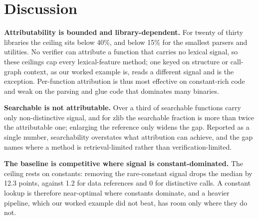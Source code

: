 \documentclass[conference]{IEEEtran}
\begin{document}
\section{Discussion}
\textbf{Attributability is bounded and library-dependent.} For twenty of thirty
libraries the ceiling sits below 40\%, and below 15\% for the smallest parsers and
utilities. No verifier can attribute a function that carries no lexical signal, so
these ceilings cap every lexical-feature method; one keyed on structure or call-graph
context, as our worked example is, reads a different signal and is the exception.
Per-function attribution is thus most effective on constant-rich code and weak on the
parsing and glue code that dominates many binaries.

\textbf{Searchable is not attributable.} Over a third of searchable functions carry only
non-distinctive signal, and for zlib the searchable fraction is more than twice the
attributable one; enlarging the reference only widens the gap. Reported as a single
number, searchability overstates what attribution can achieve, and the gap names where
a method is retrieval-limited rather than verification-limited.

\textbf{The baseline is competitive where signal is constant-dominated.} The ceiling
rests on constants: removing the rare-constant signal drops the median by 12.3 points,
against 1.2 for data references and 0 for distinctive calls. A constant lookup is
therefore near-optimal where constants dominate, and a heavier pipeline, which our
worked example did not beat, has room only where they do not.
\end{document}
